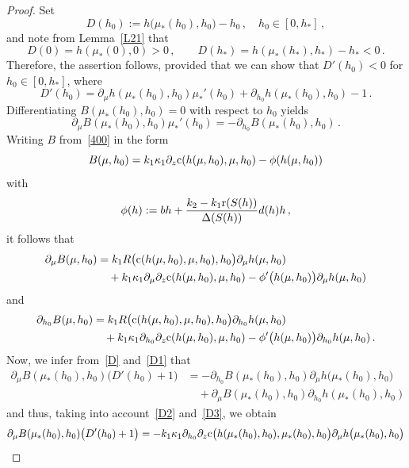 \documentclass[reqno,11pt]{amsart}
\numberwithin{equation}{section}
\begin{document}
\begin{proof}
Set
$$
D(h_0):=h\big(\mu_*(h_0),h_0)-h_0\,,\quad h_0\in [0,h_*]\,,
$$
and note from Lemma~\ref{L21} that
$$
D(0)=h(\mu_*(0),0)>0\,,\qquad  D(h_*)=h(\mu_*(h_*),h_*)-h_*<0\,.
$$
Therefore, the assertion follows, provided that we can show that $D'(h_0)<0$ for $h_0\in[0,h_*]$, where
\begin{equation}\label{D}
D'(h_0)=\partial_\mu h(\mu_*(h_0),h_0)\mu_*'(h_0)+\partial_{h_0}h(\mu_*(h_0),h_0)-1\,.
\end{equation}
Differentiating $B(\mu_*(h_0),h_0)=0$ with respect to $h_0$ yields
\begin{equation}\label{D1}
\partial_\mu B(\mu_*(h_0),h_0)\mu_*'(h_0)=-\partial_{h_0}B(\mu_*(h_0),h_0)\,.
\end{equation}
Writing $B$ from~\eqref{400} in the form 
$$
B(\mu,h_0)=k_1\kappa_1\partial_z{\rm c}(h(\mu,h_0),\mu,h_0)-\phi(h(\mu,h_0)) 
$$
with
$$
\phi(h):=bh+\frac{k_2-k_1{\rm r}(S(h))}{\Delta(S(h))}d(h)h\,,
$$
it follows that
\begin{equation}\label{D2}
\begin{split}
\partial_\mu B(\mu,h_0)&=k_1 R\big({\rm c}(h(\mu,h_0),\mu,h_0),h_0\big) \partial_\mu h(\mu,h_0)\\
&\quad +
k_1\kappa_1 \partial_\mu\partial_z {\rm c}(h(\mu,h_0),\mu,h_0) - \phi'\big(h(\mu,h_0)\big)\partial_\mu h(\mu,h_0)
\end{split}
\end{equation}
and
\begin{equation}\label{D3}
\begin{split}
\partial_{h_0} B(\mu,h_0)&=k_1 R\big({\rm c}(h(\mu,h_0),\mu,h_0),h_0\big) \partial_{h_0} h(\mu,h_0)\\
&\quad +
k_1\kappa_1 \partial_{h_0}\partial_z {\rm c}(h(\mu,h_0),\mu,h_0) - \phi'\big(h(\mu,h_0)\big)\partial_{h_0} h(\mu,h_0)\,.
\end{split}
\end{equation}
Now, we infer from~\eqref{D} and~\eqref{D1} that
\begin{align*}
\partial_{\mu}B(\mu_*(h_0),h_0)\big(D'(h_0)+1\big)&=-\partial_{h_0}B(\mu_*(h_0),h_0) \partial_{\mu}h\big(\mu_*(h_0),h_0)\\
&\quad +\partial_{\mu}B(\mu_*(h_0),h_0) \partial_{h_0} h(\mu_*(h_0),h_0) 
\end{align*}
and thus, taking into account~\eqref{D2} and~\eqref{D3}, we obtain
\begin{align*}
\partial_{\mu}B(\mu_*(h_0),h_0)\big(D'(h_0)+1\big)&=-k_1\kappa_1 \partial_{h_0}\partial_z {\rm c}\big(h(\mu_*(h_0),h_0),\mu_*(h_0),h_0\big) \partial_{\mu} h\big(\mu_*(h_0),h_0\big)\\

\end{align*}
\end{proof}
\end{document}
